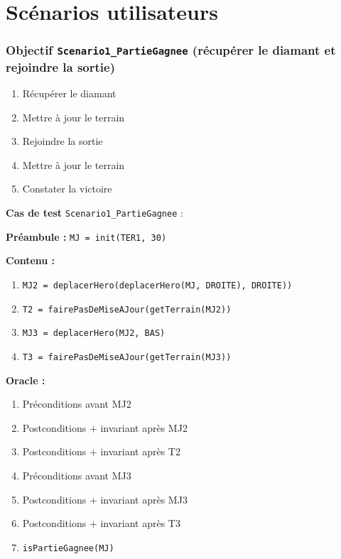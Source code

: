 \documentclass{article}
\newcommand{\cmd}[1]{\texttt{#1}}
\newcommand{\obj}[2]{\subsubsection*{\large{\textbf{Objectif {\cmd{#1} (#2)}}}}}
\newenvironment{cas}[1]
{
	\hspace{1em}\textbf{Cas de test} \cmd{#1} :
	\begin{list}{}{}
}{
	\end{list}\vspace{1em}
}
\newcommand{\pre}[1]{\item \textbf{Préambule :} \cmd{#1}}
\newcommand{\oram}{\item \textbf{Oracle :}}
\newcommand{\opem}{\item \textbf{Contenu :}}
\begin{document}
\clearpage{}




































\section{Scénarios utilisateurs}

\obj{Scenario1\_PartieGagnee} {récupérer le diamant et rejoindre la sortie}

	\begin{enumerate}
		\item Récupérer le diamant
		\item Mettre à jour le terrain
		\item Rejoindre la sortie
		\item Mettre à jour le terrain
		\item Constater la victoire
	\end{enumerate}

	\begin{cas} {Scenario1\_PartieGagnee}
		\pre{MJ = init(TER1, 30)}
		\opem{}
		\begin{enumerate}
			\item \cmd{MJ2 = deplacerHero(deplacerHero(MJ, DROITE), DROITE))}
			\item \cmd{T2 = fairePasDeMiseAJour(getTerrain(MJ2))}
			\item \cmd{MJ3 = deplacerHero(MJ2, BAS)}
			\item \cmd{T3 = fairePasDeMiseAJour(getTerrain(MJ3))}
		\end{enumerate}
		\oram{}
		\begin{enumerate}
			\item Préconditions avant MJ2
			\item Postconditions + invariant après MJ2
			\item Postconditions + invariant après T2
			\item Préconditions avant MJ3
			\item Postconditions + invariant après MJ3
			\item Postconditions + invariant après T3
			\item \cmd{isPartieGagnee(MJ)}
		\end{enumerate}
	\end{cas}
\end{document}
